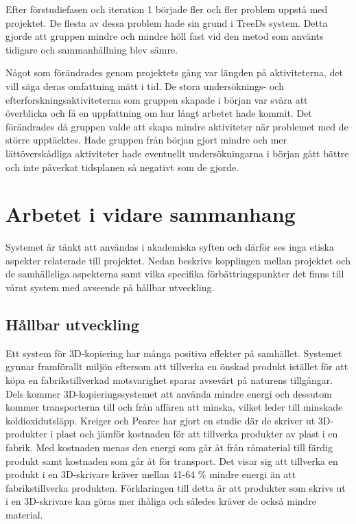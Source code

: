 Efter förstudiefasen och iteration 1 började fler och fler problem uppstå med projektet. De flesta av dessa problem hade sin grund i TreeDs system. Detta gjorde att gruppen mindre och mindre höll fast vid den metod som använts tidigare och sammanhållning blev sämre.

Något som förändrades genom projektets gång var längden på aktiviteterna, det vill säga deras omfattning mätt i tid. De stora undersöknings- och efterforskningsaktiviteterna som gruppen skapade i början var svåra att överblicka och få en uppfattning om hur långt arbetet hade kommit. Det förändrades då gruppen valde att skapa mindre aktiviteter när problemet med de större upptäcktes. Hade gruppen från början gjort mindre och mer lättöverskådliga aktiviteter hade eventuellt undersökningarna i början gått bättre och inte påverkat tidsplanen så negativt som de gjorde.

\section{Arbetet i vidare sammanhang}
\label{sec:work-wider-context}

Systemet är tänkt att användas i akademiska syften och därför ses inga etiska aspekter relaterade till projektet. Nedan beskrivs kopplingen mellan projektet och de samhälleliga aspekterna samt vilka specifika förbättringspunkter det finns till vårat system med avseende på hållbar utveckling.

\subsection{Hållbar utveckling}
\label{disc:hållbar_utveckling}
Ett system för 3D-kopiering har många positiva effekter på samhället. Systemet gynnar framförallt miljön eftersom att tillverka en önskad produkt istället för att köpa en fabrikstillverkad motsvarighet sparar avsevärt på naturens tillgångar. Dels kommer 3D-kopieringssystemet att använda mindre energi och dessutom kommer transporterna till och från affären att minska, vilket leder till minskade koldioxidutsläpp. Kreiger och Pearce  \cite{kreiger2013environmental} har gjort en studie där de skriver ut 3D-produkter i plast och jämför kostnaden för att tillverka produkter av plast i en fabrik. Med kostnaden menas den energi som går åt från råmaterial till färdig produkt samt kostnaden som går åt för transport. Det visar sig att tillverka en produkt i en 3D-skrivare kräver mellan 41-64 \% mindre energi än att fabrikstillverka produkten. Förklaringen till detta är att produkter som skrivs ut i en 3D-skrivare kan göras mer ihåliga och således kräver de också mindre material.

